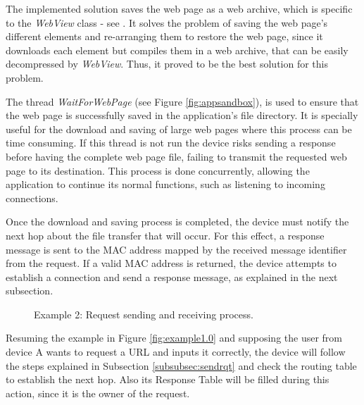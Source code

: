 The implemented solution saves the web page as a web archive, which is specific to the \textit{WebView} class - see \cite{webview}. It solves the problem of saving the web page's different elements and re-arranging them to restore the web page, since it downloads each element but compiles them in a web archive, that can be easily decompressed by \textit{WebView}. Thus, it proved to be the best solution for this problem.

The thread \textit{WaitForWebPage} (see Figure \ref{fig:appsandbox}), is used to ensure that the web page is successfully saved in the application's file directory. It is specially useful for the download and saving of large web pages where this process can be time consuming. If this thread is not run the device risks sending a response before having the complete web page file, failing to transmit the requested web page to its destination. This process is done concurrently, allowing the application to continue its normal functions, such as listening to incoming connections.

Once the download and saving process is completed, the device must notify the next hop about the file transfer that will occur. For this effect, a response message is sent to the \gls{MAC} address mapped by the received message identifier from the request. If a valid \gls{MAC} address is returned, the device attempts to establish a connection and send a response message, as explained in the next subsection.

\begin{figure}[ht]
   \noindent{}
	\caption{\label{fig:example1.1} Example 2: Request sending and receiving process.}
\end{figure}

Resuming the example in Figure \ref{fig:example1.0} and supposing the user from device A wants to request a \gls{URL} and inputs it correctly, the device will follow the steps explained in Subsection \ref{subsubsec:sendrqt} and check the routing table to establish the next hop. Also its Response Table will be filled during this action, since it is the owner of the request.

